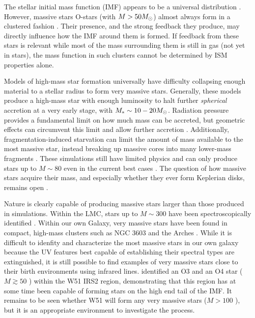 \documentclass{emulateapj}
\begin{document}
The stellar initial mass function (IMF) appears to be a universal distribution
\citep{Bastian2010a}.  However, massive stars O-stars (with $M>50 M_{\odot}$)
almost always form in a clustered fashion \citep[in proto-clusters or
proto-associations][]{de-Wit2004a,de-Wit2005a,Parker2007a}. %
Their presence, and the strong feedback they produce, may directly influence
how the IMF around them is formed.  If feedback from these stars is relevant
while most of the  mass surrounding them is still in gas (not yet in stars),
the mass function in such clusters cannot be determined by ISM properties
alone. 

Models of high-mass star formation universally have difficulty collapsing enough
material to a stellar radius to form very massive stars.  Generally, these models
produce a high-mass star with enough luminosity to halt further
\emph{spherical} accretion at a very early stage, with $M_* \sim 10-20M_{\odot}$.
Radiation pressure provides a fundamental limit on how much mass can be
accreted, but geometric effects can circumvent this limit and allow
further accretion
\citep{Yorke2002a,Krumholz2005b,Krumholz2009a,Krumholz2009b,Kuiper2012a,Kuiper2013c,Rosen2016a}.
Additionally, fragmentation-induced starvation can limit the amount of mass
available to the most massive star, instead breaking up massive cores into many
lower-mass fragments \citep{Peters2010a}.  These simulations still have limited
physics and can only produce stars up to $M\sim80$ \msun even in the current
best cases \citep{Kuiper2015a,Kuiper2016a}.  The question of how massive stars
acquire their mass, and especially whether they ever form Keplerian disks,
remains open \citep{Beltran2016b}.

Nature is clearly capable of producing massive stars larger than those produced
in simulations.  Within the LMC, stars up to $M\sim300$ \msun have been
spectroscopically identified \citep{Crowther2016a}.  Within our own Galaxy,
very massive stars have been found in compact, high-mass clusters such as NGC
3603 and the Arches \citep{Crowther2010a}.  While it is difficult to idenfity
and characterize the most massive stars in our own galaxy because the UV
features best capable of establishing their spectral types are 
extinguished,
it is still possible to find examples of very massive stars close to their
birth environments using infrared lines.  \citet{Barbosa2008a} identified an O3
and an O4 star ($M\gtrsim50$ \msun) within the W51 IRS2 region, demonstrating
that this region has at some time been capable of forming stars on the high
end tail of the IMF.  It remains to be seen whether W51 will form any very
massive stars ($M>100$ \msun), but it is  an appropriate environment to
investigate the process.
\end{document}
